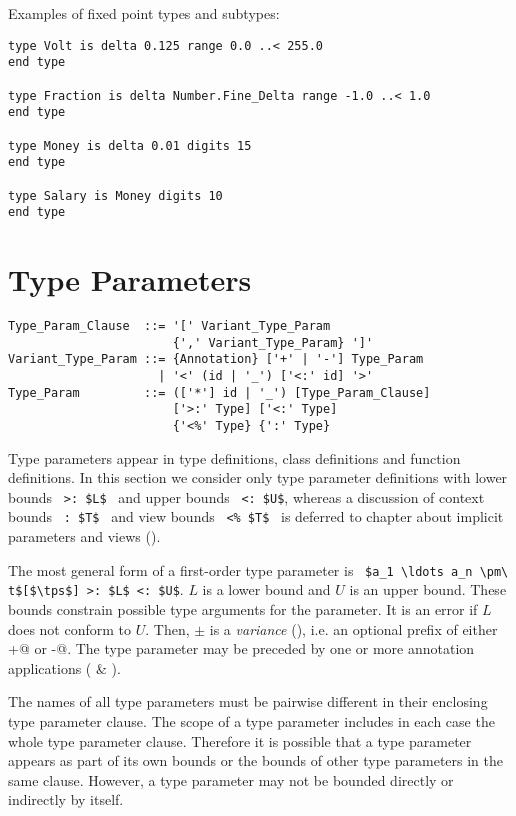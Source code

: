 \example Examples of fixed point types and subtypes:
\begin{lstlisting}
type Volt is delta 0.125 range 0.0 ..< 255.0 
end type

type Fraction is delta Number.Fine_Delta range -1.0 ..< 1.0 
end type

type Money is delta 0.01 digits 15 
end type

type Salary is Money digits 10 
end type
\end{lstlisting}








\section{Type Parameters}

\syntax\begin{lstlisting}
Type_Param_Clause  ::= '[' Variant_Type_Param 
                       {',' Variant_Type_Param} ']'
Variant_Type_Param ::= {Annotation} ['+' | '-'] Type_Param
                     | '<' (id | '_') ['<:' id] '>'
Type_Param         ::= (['*'] id | '_') [Type_Param_Clause]
                       ['>:' Type] ['<:' Type]
                       {'<%' Type} {':' Type}
\end{lstlisting}

Type parameters appear in type definitions, class definitions and function definitions. In this section we consider only type parameter definitions with lower bounds ~\lstinline!>: $L$!~ and upper bounds ~\lstinline!<: $U$!, whereas a discussion of context bounds ~\lstinline!: $T$!~ and view bounds ~\lstinline!<% $T$!~ is deferred to chapter about implicit parameters and views ().

The most general form of a first-order type parameter is ~\lstinline!$a_1 \ldots a_n \pm\ t$[$\tps$] >: $L$ <: $U$!. $L$ is a lower bound and $U$ is an upper bound. These bounds constrain possible type arguments for the parameter. It is an error if $L$ does not conform to $U$. Then, $\pm$ is a {\em variance} (), i.e. an optional prefix of either \lstinline@+@ or \lstinline@-@. The type parameter may be preceded by one or more annotation applications ( \& ).

The names of all type parameters must be pairwise different in their enclosing type parameter clause. The scope of a type parameter includes in each case the whole type parameter clause. Therefore it is possible that a type parameter appears as part of its own bounds or the bounds of other type parameters in the same clause. However, a type parameter may not be bounded directly or indirectly by itself. 

